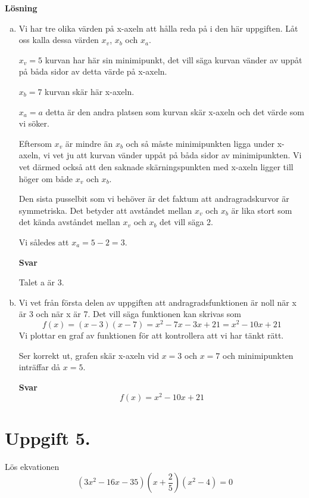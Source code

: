 \documentclass[fleqn]{article}
\begin{document}
\textbf{Lösning}
\begin{enumerate}[(a)]
\item
Vi har tre olika värden på x-axeln att hålla reda på i den här uppgiften. Låt oss kalla dessa värden $x_v$, $x_b$ och $x_a$.

$x_v = 5$ kurvan har här sin minimipunkt, det vill säga kurvan vänder av uppåt på båda sidor av detta värde på x-axeln.

$x_b = 7$ kurvan skär här x-axeln.

$x_a = a$ detta är den andra platsen som kurvan skär x-axeln och det värde som vi söker.

Eftersom $x_v$ är mindre än $x_b$ och så måste minimipunkten ligga under x-axeln, vi vet ju att kurvan vänder uppåt på båda sidor av minimipunkten. Vi vet därmed också att den saknade skärningspunkten med x-axeln ligger till höger om både $x_v$ och $x_b$.

Den sista pusselbit som vi behöver är det faktum att andragradskurvor är symmetriska. Det betyder att avståndet mellan $x_v$ och $x_b$ är lika stort som det kända avståndet mellan $x_v$ och $x_b$ det vill säga 2.

Vi således att $x_a = 5 - 2 = 3$.

\textbf{Svar}

Talet a är 3. 

\item
Vi vet från första delen av uppgiften att andragradsfunktionen är noll när x är 3 och när x är 7. Det vill säga funktionen kan skrivas som
\[
f(x) = (x-3)(x-7) = x^2 - 7x - 3x + 21 = x^2 - 10x + 21  
\]
Vi plottar en graf av funktionen för att kontrollera att vi har tänkt rätt.


Ser korrekt ut, grafen skär x-axeln vid $x=3$ och $x=7$ och minimipunkten inträffar då $x=5$.

\textbf{Svar}
\[
f(x) = x^2 - 10x + 21
\]

\end{enumerate}

\newpage
\section*{Uppgift 5.}

Lös ekvationen
\[
(3x^2 - 16x - 35)(x + \dfrac{2}{5})(x^2-4)=0
\]
\end{document}
